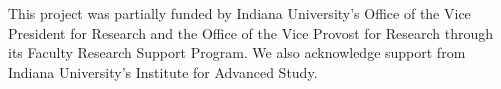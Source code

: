 \documentclass[preprint]{sigplanconf}
\newcommand{\G}{\ensuremath{\mathcal{G}}\xspace}
\begin{document}

\acks This project was partially funded by Indiana University's Office
of the Vice President for Research and the Office of the Vice Provost
for Research through its Faculty Research Support Program.  We also
acknowledge support from Indiana University's Institute for Advanced
Study.

\begin{small}


\end{small}
\end{document}
